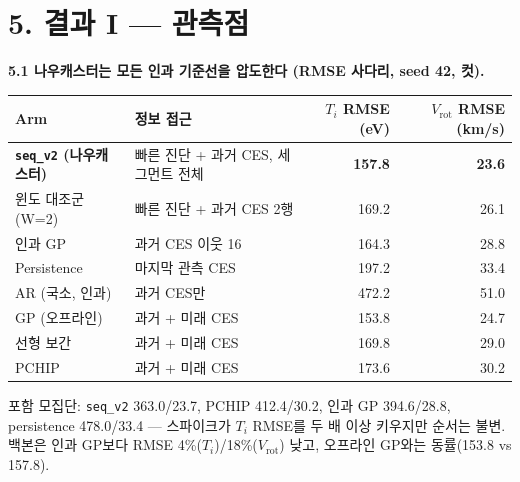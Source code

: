 \documentclass[10pt,a4paper]{article}
\newcommand{\Ti}{\ensuremath{T_i}}
\newcommand{\Vrot}{\ensuremath{V_\mathrm{rot}}}
\newcommand{\seqv}{\texttt{seq\_v2}}
\begin{document}
\section*{5. 결과 I — 관측점}
\textbf{5.1 나우캐스터는 모든 인과 기준선을 압도한다 (RMSE 사다리, seed 42, 컷).}
\begin{center}\small
\begin{tabular}{llrr}\toprule
Arm & 정보 접근 & \Ti{} RMSE (eV) & \Vrot{} RMSE (km/s) \\ \midrule
\textbf{\seqv{} (나우캐스터)} & 빠른 진단 + 과거 CES, 세그먼트 전체 & \textbf{157.8} & \textbf{23.6} \\
윈도 대조군 (W=2) & 빠른 진단 + 과거 CES 2행 & 169.2 & 26.1 \\
인과 GP & 과거 CES 이웃 16 & 164.3 & 28.8 \\
Persistence & 마지막 관측 CES & 197.2 & 33.4 \\
AR (국소, 인과) & 과거 CES만 & 472.2 & 51.0 \\ \midrule
GP (오프라인) & 과거 + 미래 CES & 153.8 & 24.7 \\
선형 보간 & 과거 + 미래 CES & 169.8 & 29.0 \\
PCHIP & 과거 + 미래 CES & 173.6 & 30.2 \\ \bottomrule
\end{tabular}
\end{center}
포함 모집단: \seqv{} 363.0/23.7, PCHIP 412.4/30.2, 인과 GP 394.6/28.8, persistence 478.0/33.4 — 스파이크가 \Ti{} RMSE를 두 배 이상 키우지만 순서는 불변. 백본은 인과 GP보다 RMSE 4\%(\Ti)/18\%(\Vrot) 낮고, 오프라인 GP와는 동률(153.8 vs 157.8).
\end{document}
